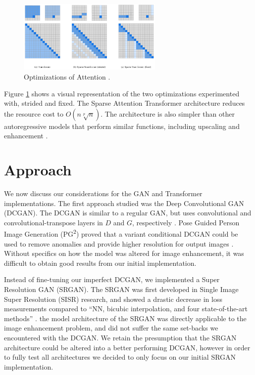 \documentclass[letterpaper]{article} %
\begin{document}
\begin{figure}[htbp]
\centerline{\includegraphics[width=7cm]{attention_comparison.png}}
\caption{Optimizations of Attention
\cite{generative_transformers}.}
\label{fig:attention_optimization}
\end{figure}

Figure \ref{fig:attention_optimization} shows a visual representation of
the two optimizations experimented with, strided and fixed.
The Sparse Attention Transformer architecture reduces the resource cost to
$O(n\sqrt[p]{n})$.
The architecture is also simpler than other autoregressive models that perform
similar functions, including upscaling and enhancement \cite{pixel_subscale}.

\section{Approach}
We now discuss our considerations for the GAN and Transformer implementations.
The first approach studied was the
Deep Convolutional GAN (DCGAN).
The DCGAN
is similar to a regular GAN,
but uses convolutional and convolutional-transpose layers in $D$ and $G$, respectively
\cite{unsupervised_learning}.
Pose Guided Person Image Generation (PG\textsuperscript{2})
proved that a variant conditional DCGAN could be used to
remove anomalies and provide higher resolution for output images
\cite{pose_guided_image_generation}.
Without specifics on how the model was altered for image enhancement,
it was difficult to obtain good results from our initial implementation.

Instead of fine-tuning our imperfect DCGAN, we implemented a
Super Resolution GAN (SRGAN).
The SRGAN was first developed in
Single Image Super Resolution (SISR) research, and showed a drastic decrease in loss measurements
compared to ``NN, bicubic interpolation, and four state-of-the-art methods''
\cite{srgan}.
the model architecture of the SRGAN was directly applicable to the image enhancement problem,
and did not suffer the same set-backs we encountered with the DCGAN.
We retain the presumption that the SRGAN architecture could be altered into a better performing DCGAN,
however in order to fully test all architectures we decided to only focus on our initial SRGAN implementation.
\end{document}
